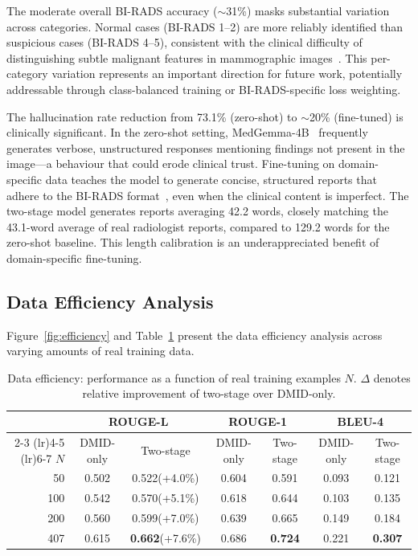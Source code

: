 \documentclass{wlscirep}
\begin{document}
The moderate overall BI-RADS accuracy ($\sim$31\%) masks substantial variation across categories. Normal cases (BI-RADS 1--2) are more reliably identified than suspicious cases (BI-RADS 4--5), consistent with the clinical difficulty of distinguishing subtle malignant features in mammographic images~\cite{sechopoulos2021artificial}. This per-category variation represents an important direction for future work, potentially addressable through class-balanced training or BI-RADS-specific loss weighting.

The hallucination rate reduction from 73.1\% (zero-shot) to $\sim$20\% (fine-tuned) is clinically significant. In the zero-shot setting, MedGemma-4B~\cite{lin2024medgemma} frequently generates verbose, unstructured responses mentioning findings not present in the image---a behaviour that could erode clinical trust. Fine-tuning on domain-specific data teaches the model to generate concise, structured reports that adhere to the BI-RADS format~\cite{birads2013}, even when the clinical content is imperfect. The two-stage model generates reports averaging 42.2 words, closely matching the 43.1-word average of real radiologist reports, compared to 129.2 words for the zero-shot baseline. This length calibration is an underappreciated benefit of domain-specific fine-tuning.

\subsection*{Data Efficiency Analysis}

Figure~\ref{fig:efficiency} and Table~\ref{tab:efficiency} present the data efficiency analysis across varying amounts of real training data.

\begin{table}[H]
\centering
\caption{Data efficiency: performance as a function of real training examples $N$. $\Delta$ denotes relative improvement of two-stage over DMID-only.}
\label{tab:efficiency}
\begin{tabular}{rcccccc}
\toprule
& \multicolumn{2}{c}{\textbf{ROUGE-L}} & \multicolumn{2}{c}{\textbf{ROUGE-1}} & \multicolumn{2}{c}{\textbf{BLEU-4}} \\
\cmidrule(lr){2-3} \cmidrule(lr){4-5} \cmidrule(lr){6-7}
$N$ & DMID-only & Two-stage & DMID-only & Two-stage & DMID-only & Two-stage \\
\midrule
50  & 0.502 & 0.522\;(+4.0\%) & 0.604 & 0.591 & 0.093 & 0.121 \\
100 & 0.542 & 0.570\;(+5.1\%) & 0.618 & 0.644 & 0.103 & 0.135 \\
200 & 0.560 & 0.599\;(+7.0\%) & 0.639 & 0.665 & 0.149 & 0.184 \\
407 & 0.615 & \textbf{0.662}\;(+7.6\%) & 0.686 & \textbf{0.724} & 0.221 & \textbf{0.307} \\
\bottomrule
\end{tabular}
\end{table}
\end{document}
